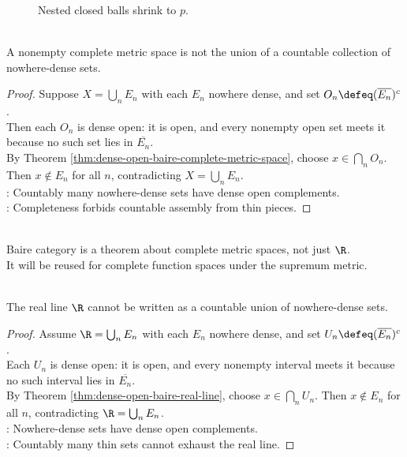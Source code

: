 \begin{figure}[H]
  \centering
  
  \caption{Nested closed balls shrink to \(p\).}
  \label{fig:baire-nested-closed-balls}
\end{figure}

\begin{theorem} \label{thm:baire-category-complete-metric-space} \\
A nonempty complete metric space is not the union of a countable collection of nowhere-dense sets.
\begin{proof}
Suppose $X=\bigcup_nE_n$ with each $E_n$ nowhere dense, and set $O_n\defeq(\overline{E_n})^c$.\\
Then each $O_n$ is dense open: it is open, and every nonempty open set meets it because no such set lies in $\overline{E_n}$.\\
By Theorem \ref{thm:dense-open-baire-complete-metric-space}, choose $x\in\bigcap_nO_n$. Then $x\notin E_n$ for all $n$, contradicting $X=\bigcup_nE_n$.\\
: Countably many nowhere-dense sets have dense open complements.\\
: Completeness forbids countable assembly from thin pieces.
\end{proof}
\end{theorem}

\begin{perspective} \label{per:baire-category-in-function-spaces} \\
Baire category is a theorem about complete metric spaces, not just $\R$.\\
It will be reused for complete function spaces under the supremum metric.
\end{perspective}

\begin{theorem} \label{thm:baire-category-real-line} \\
The real line $\R$ cannot be written as a countable union of nowhere-dense sets.
\begin{proof}
Assume $\R=\bigcup_nE_n$ with each $E_n$ nowhere dense, and set $U_n\defeq(\overline{E_n})^c$.\\
Each $U_n$ is dense open: it is open, and every nonempty interval meets it because no such interval lies in $\overline{E_n}$.\\
By Theorem \ref{thm:dense-open-baire-real-line}, choose $x\in\bigcap_nU_n$. Then $x\notin E_n$ for all $n$, contradicting $\R=\bigcup_nE_n$.\\
: Nowhere-dense sets have dense open complements.\\
: Countably many thin sets cannot exhaust the real line.
\end{proof}
\end{theorem}

